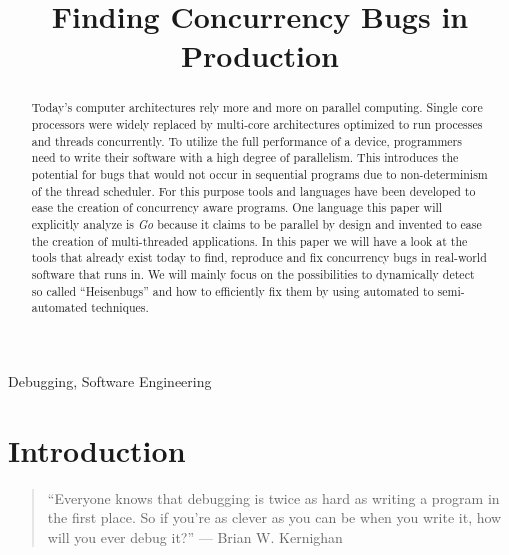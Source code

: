 \documentclass[conference]{IEEEtran}
\begin{document}
\title{Finding Concurrency Bugs in Production}

\author{
}

\maketitle

\begin{abstract}
Today's computer architectures rely more and more on parallel computing.
Single core processors were widely replaced by multi-core architectures optimized to run processes and threads concurrently.
To utilize the full performance of a device, programmers need to write their software with a high degree of parallelism.
This introduces the potential for bugs that would not occur in sequential programs due to non-determinism of the thread scheduler.
For this purpose tools and languages have been developed to ease the creation of concurrency aware programs.
One language this paper will explicitly analyze is \emph{Go} because it claims to be parallel by design and invented to ease the creation of multi-threaded applications.
In this paper we will have a look at the tools that already exist today to find, reproduce and fix concurrency bugs in real-world software that runs in.
We will mainly focus on the possibilities to dynamically detect so called ``Heisenbugs'' and how to efficiently fix them by using automated to semi-automated techniques.
\end{abstract}

\begin{IEEEkeywords}
    Debugging, Software Engineering
\end{IEEEkeywords}


\section{Introduction}
\begin{quote}
``Everyone knows that debugging is twice as hard as writing a program in the first place. So if you're as clever as you can be when you write it, how will you ever debug it?'' --- Brian W. Kernighan\cite{kernighan1974elements}
\end{quote}
\end{document}
